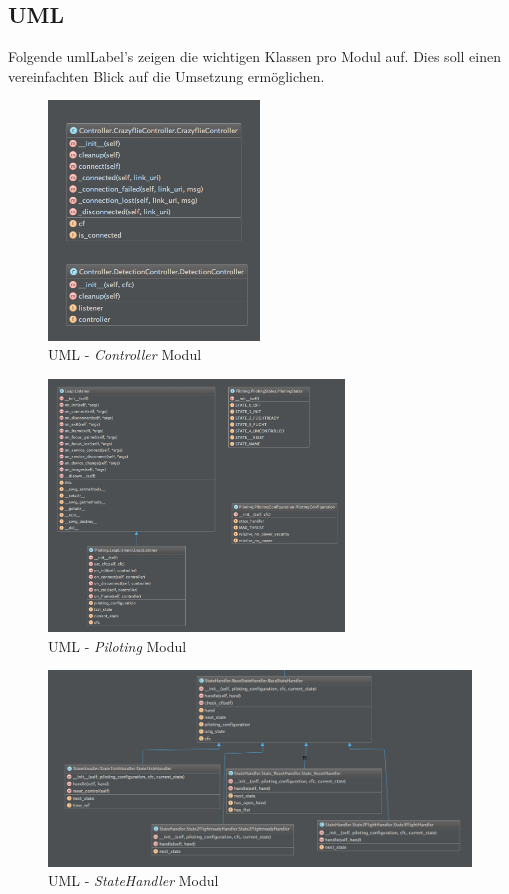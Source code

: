 \subsection{UML}
Folgende \gls{umlLabel}'s zeigen die wichtigen Klassen pro Modul auf. Dies soll einen vereinfachten Blick auf die Umsetzung ermöglichen.

\begin{figure}[H]
	\centering
	\includegraphics[width=0.5\textwidth]{figures/poc/uml/controller.png}
	\caption{UML - \textit{Controller} Modul}
\end{figure}

\begin{figure}[H]
	\centering
	\includegraphics[width=0.7\textwidth]{figures/poc/uml/piloting.png}
	\caption{UML - \textit{Piloting} Modul}
\end{figure}

\begin{figure}[H]
	\centering
	\includegraphics[width=1.0\textwidth]{figures/poc/uml/stateHandler.png}
	\caption{UML - \textit{StateHandler} Modul}
\end{figure}


